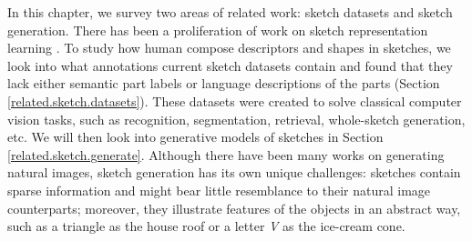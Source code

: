 
In this chapter, we survey two areas of related work: sketch datasets and sketch generation. 
There has been a proliferation of work on sketch representation learning \citep{ha2017neural,  eitz2012hdhso,spg_paper, qmulDataset, doodlerGAN, kim2019codraw, aksan2020cose, ribeiro2020sketchformer, Sketchpix2seqPaper, sketchBertPaper}. 
To study how human compose descriptors and shapes in sketches, we look into what annotations current sketch datasets contain and found that they lack either semantic part labels or language descriptions of the parts (Section \ref{related.sketch.datasets}).    
These datasets were created to solve classical computer vision tasks, such as recognition, segmentation, retrieval, whole-sketch generation, etc. 
We will then look into generative models of sketches in Section \ref{related.sketch.generate}. Although there have been many works on generating natural images, sketch generation has its own unique challenges: sketches contain sparse information and might bear little resemblance to their natural image counterparts; moreover, they illustrate features of the objects in an abstract way, such as a triangle as the house roof or a letter \textit{V} as the ice-cream cone. 
%  




